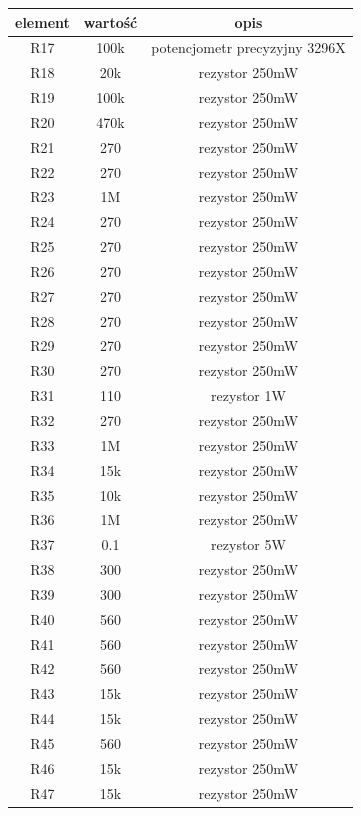 \documentclass[12pt]{article}
\begin{document}
\begin{minipage}[t]{0.45\linewidth}
\tiny
\centering
\begin{tabular}{|c|c|c|}
\hline
element & wartość & opis \\
\hline
R17 & 100k & potencjometr precyzyjny 3296X \\
\hline
R18 & 20k & rezystor 250mW \\
\hline
R19 & 100k & rezystor 250mW \\
\hline
R20 & 470k & rezystor 250mW \\
\hline
R21 & 270 & rezystor 250mW \\
\hline
R22 & 270 & rezystor 250mW \\
\hline
R23 & 1M & rezystor 250mW \\
\hline
R24 & 270 & rezystor 250mW \\
\hline
R25 & 270 & rezystor 250mW \\
\hline
R26 & 270 & rezystor 250mW \\
\hline
R27 & 270 & rezystor 250mW \\
\hline
R28 & 270 & rezystor 250mW \\
\hline
R29 & 270 & rezystor 250mW \\
\hline
R30 & 270 & rezystor 250mW \\
\hline
R31 & 110 & rezystor 1W \\
\hline
R32 & 270 & rezystor 250mW \\
\hline
R33 & 1M & rezystor 250mW \\
\hline
R34 & 15k & rezystor 250mW \\
\hline
R35 & 10k & rezystor 250mW \\
\hline
R36 & 1M & rezystor 250mW \\
\hline
R37 & 0.1 & rezystor 5W \\
\hline
R38 & 300 & rezystor 250mW \\
\hline
R39 & 300 & rezystor 250mW \\
\hline
R40 & 560 & rezystor 250mW \\
\hline
R41 & 560 & rezystor 250mW \\
\hline
R42 & 560 & rezystor 250mW \\
\hline
R43 & 15k & rezystor 250mW \\
\hline
R44 & 15k & rezystor 250mW \\
\hline
R45 & 560 & rezystor 250mW \\
\hline
R46 & 15k & rezystor 250mW \\
\hline
R47 & 15k & rezystor 250mW \\

\end{tabular}
\end{minipage}
\end{document}
